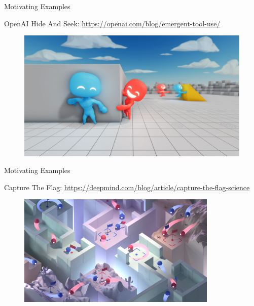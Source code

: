 \documentclass[presentation, 8pt]{beamer}\mode<presentation>{\usetheme{AMSBolognaFC}}
\begin{document}
\begin{frame}{Motivating Examples}
\centering
\begin{exampleblock}{OpenAI Hide And Seek: \url{https://openai.com/blog/emergent-tool-use/}}
	\begin{figure}
		\href{https://www.youtube.com/watch?v=kopoLzvh5jY}{\includegraphics[width=\textwidth]{img/open-ai.jpg}}
	\end{figure}
\end{exampleblock}
\end{frame}
\begin{frame}{Motivating Examples}
\begin{exampleblock}{Capture The Flag: \url{https://deepmind.com/blog/article/capture-the-flag-science}}
	\begin{figure}
		\centering
		\href{https://www.youtube.com/watch?v=dltN4MxV1RI}{\includegraphics[width=0.85\textwidth]{img/capture-the-flag.png}}
	\end{figure}	
\end{exampleblock}
\end{frame}
\end{document}
